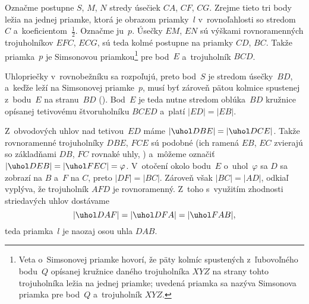 {%
Označme postupne $S$, $M$, $N$ stredy úsečiek $CA$, $CF$, $CG$. Zrejme tieto tri body ležia na jednej priamke, ktorá je obrazom priamky~$l$ v~rovnoľahlosti so stredom~$C$ a~koeficientom~$\frac12$. Označme ju~$p$. Úsečky $EM$, $EN$ sú výškami rovnoramenných trojuholníkov $EFC$, $ECG$, sú teda kolmé postupne na priamky $CD$, $BC$. Takže priamka~$p$ je Simsonovou priamkou\footnote{Veta o~Simsonovej priamke hovorí, že päty kolmíc spustených z~ľubovoľného bodu~$Q$ opísanej kružnice daného trojuholníka $XYZ$ na strany tohto trojuholníka ležia na jednej priamke; uvedená priamka sa nazýva Simsonova priamka pre bod~$Q$ a~trojuholník $XYZ$.} pre bod~$E$ a~trojuholník $BCD$.
%

Uhlopriečky v~rovnobežníku sa rozpoľujú, preto bod~$S$ je stredom úsečky~$BD$, a~keďže leží na Simsonovej priamke~$p$, musí byť zároveň pätou kolmice spustenej z~bodu~$E$ na stranu~$BD$ (\obr). Bod~$E$ je teda nutne stredom oblúka~$BD$ kružnice opísanej tetivovému štvoruholníku $BCED$ a~platí $|ED|=|EB|$.

Z~obvodových uhlov nad tetivou~$ED$ máme $|\uhol DBE|=|\uhol DCE|$. Takže rovnoramenné trojuholníky $DBE$, $FCE$ sú podobné (ich ramená $EB$, $EC$ zvierajú so základňami $DB$, $FC$ rovnaké uhly, \obr) a~môžeme označiť $|\uhol DEB|=|\uhol FEC|=\varphi$. 
%
V~otočení okolo bodu~$E$ o~uhol~$\varphi$ sa $D$ sa zobrazí na $B$ a~$F$ na $C$, preto $|DF|=|BC|$. Zároveň však $|BC|=|AD|$, odkiaľ vyplýva, že trojuholník $AFD$ je rovnoramenný. Z~toho s~využitím zhodnosti striedavých uhlov dostávame
$$
|\uhol DAF|=|\uhol DFA|=|\uhol FAB|,
$$
teda priamka~$l$ je naozaj osou uhla $DAB$.
}

